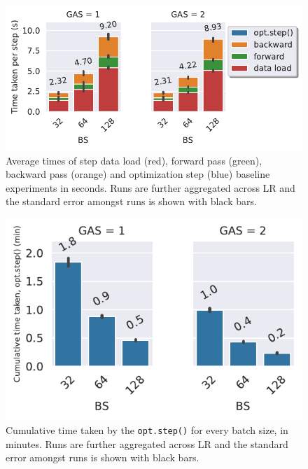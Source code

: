 \begin{minipage}{\linewidth}
    \begin{minipage}{0.45\linewidth}
        \begin{figure}[H]
            \centering
            \includegraphics[width=\textwidth]{./figures/06_barplot-times_baseline-16vCPUs-GAS-1.pdf}
            \caption{
                Average times of step data load (red), forward pass (green), backward pass (orange) and optimization step (blue) baseline experiments in seconds.
                Runs are further aggregated across LR and the standard error amongst runs is shown with black bars.
            }
            \label{fig:baseline-times-stacked}
        \end{figure}
    \end{minipage}
    \hspace{0.05\linewidth}
    \begin{minipage}{0.45\linewidth}
        \begin{figure}[H]
            \centering
            \includegraphics[width=\textwidth]{./figures/06_barplot-times-opt_baseline-16vCPUs-GAS-1.pdf}
            \caption{
                Cumulative time taken by the \texttt{opt.step()} for every batch size, in minutes.
                Runs are further aggregated across LR and the standard error amongst runs is shown with black bars.
            }
            \label{fig:baseline-times-opt}
        \end{figure}
    \end{minipage}
\end{minipage}

